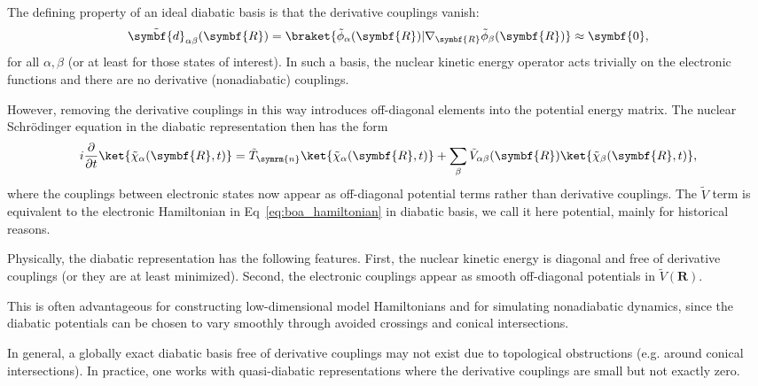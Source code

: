 The defining property of an ideal diabatic basis is that the derivative couplings vanish:
\begin{equation}
\tilde{\symbf{d}}_{\alpha\beta}(\symbf{R})=\braket{\tilde\phi_\alpha(\symbf{R})\vert\nabla_{\symbf{R}}\tilde\phi_\beta(\symbf{R})}\approx\symbf{0},
\end{equation}
for all $\alpha,\beta$ (or at least for those states of interest). In such a basis, the nuclear kinetic energy operator acts trivially on the electronic functions and there are no derivative (nonadiabatic) couplings.

However, removing the derivative couplings in this way introduces off-diagonal elements into the potential energy matrix. The nuclear Schr\"odinger equation in the diabatic representation then has the form
\begin{equation}
i\frac{\partial}{\partial{t}}\ket{\tilde\chi_\alpha(\symbf{R},t)}=\tilde{T}_{\symrm{n}}\ket{\tilde\chi_\alpha(\symbf{R},t)}+\sum_\beta\tilde{V}_{\alpha\beta}(\symbf{R})\ket{\tilde\chi_\beta(\symbf{R},t)},
\end{equation}
where the couplings between electronic states now appear as off-diagonal potential terms rather than derivative couplings. The $\tilde{V}$ term is equivalent to the electronic Hamiltonian in Eq~\eqref{eq:boa_hamiltonian} in diabatic basis, we call it here potential, mainly for historical reasons.

Physically, the diabatic representation has the following features. First, the nuclear kinetic energy is diagonal and free of derivative couplings (or they are at least minimized). Second, the electronic couplings appear as smooth off-diagonal potentials in $\tilde{V}(\symbf{R})$.

This is often advantageous for constructing low-dimensional model Hamiltonians and for simulating nonadiabatic dynamics, since the diabatic potentials can be chosen to vary smoothly through avoided crossings and conical intersections.

In general, a globally exact diabatic basis free of derivative couplings may not exist due to topological obstructions (e.g. around conical intersections). In practice, one works with quasi-diabatic representations where the derivative couplings are small but not exactly zero.
